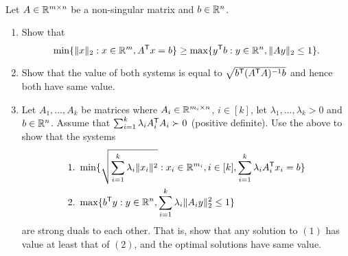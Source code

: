 \begin{exercise}~\\
Let $A \in \mathbb{R}^{m \times n}$ be a non-singular matrix and $b \in \mathbb{R}^n$. 
\begin{enumerate}
\item Show that 
\[
\min \{{\|x\|_2: x \in \mathbb{R}^m, A^{\mathsf{T}} x = b}\} \geq \max \{{ y^{\mathsf{T}} b: y \in \mathbb{R}^n, \|A
y\|_2 \leq 1}\}.
\]
\item Show that the value of both systems is equal to
$\sqrt{b^{\mathsf{T}} (A^{\mathsf{T}} A)^{-1} b}$ and hence both have same value.
\item Let $A_1,\dots,A_k$ be matrices where $A_i \in \mathbb{R}^{m_i \times n}$, $i \in
[k]$, let $\lambda_1,\dots,\lambda_k > 0$ and $b \in \mathbb{R}^n$. Assume that
$\sum_{i=1}^k \lambda _i A_i^{\mathsf{T}} A_i \succ 0$ (positive definite). Use
the above to show that the systems  
\begin{align*}
&1.~ \min \{{\sqrt{\sum_{i=1}^k \lambda_i \|x_i\|^2}: x_i \in \mathbb{R}^{m_i}, i \in [k],
\sum_{i=1}^k \lambda_i A_i^{\mathsf{T}} x_i = b}\} \\
&2.~ \max \{{ b^{\mathsf{T}} y: y \in \mathbb{R}^n, \sum_{i=1}^k \lambda_i \|A_i y\|^2_2 \leq 1}\}
\end{align*}
are strong duals to each other. That is, show that  any solution to $(1)$ has
value at least that of $(2)$, and the optimal solutions have same value.
\end{enumerate}
\end{exercise}

